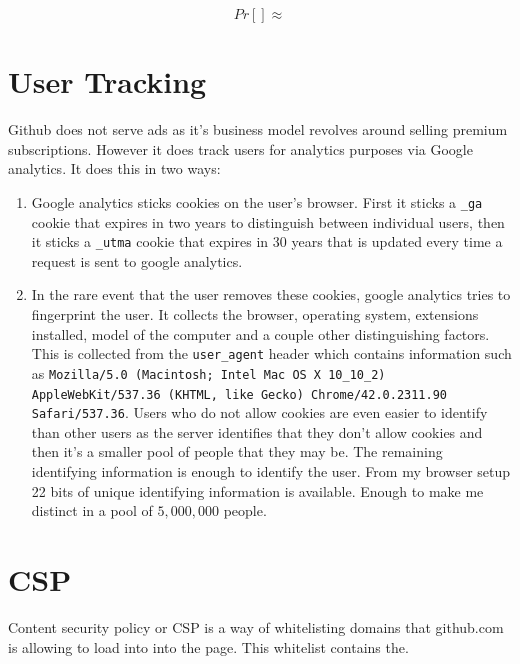 \documentclass{lposter}
\theoremstyle{plain}
\theoremstyle{definition}
\renewcommand{\tt}[1]{\texttt{#1}}
\begin{document}
\begin{poster}
$$Pr[] \approx$$




\section{User Tracking}
Github does not serve ads as it's business model revolves around selling premium subscriptions. However it does track users for analytics purposes via Google analytics. It does this in two ways:

\begin{enumerate}
\item Google analytics sticks cookies on the user's browser. First it sticks a \tt{\_ga} cookie that expires in two years to distinguish between individual users, then it sticks a \tt{\_utma} cookie that expires in 30 years that is updated every time a request is sent to google analytics. %
\item In the rare event that the user removes these cookies, google analytics tries to fingerprint the user. It collects the browser, operating system, extensions installed, model of the computer and a couple other distinguishing factors. This is collected from the \tt{user\_agent} header which contains information such as \tt{Mozilla/5.0 (Macintosh; Intel Mac OS X 10\_10\_2) AppleWebKit/537.36 (KHTML, like Gecko) Chrome/42.0.2311.90 Safari/537.36}. Users who do not allow cookies are even easier to identify than other users as the server identifies that they don't allow cookies and then it's a smaller pool of people that they may be. The remaining identifying information is enough to identify the user. From my browser setup 22 bits of unique identifying information is available. Enough to make me distinct in a pool of $5,000,000$ people.
\end{enumerate}


\section{CSP}

Content security policy or CSP is a way of whitelisting domains that github.com is allowing to load into into the page. This whitelist contains the.\\

\begin{figure}
\begin{table}
\begin{tabular}{| l | l | l | l | l | }
\hline


\end{tabular}
\end{table}
\end{figure}
\end{poster}
\end{document}
